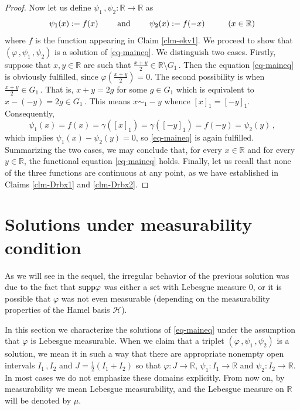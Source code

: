 \documentclass[12pt]{amsart}
\theoremstyle{remark}
\theoremstyle{definition}
\newcommand{\dlth}{\mathcal{H}}
\newcommand{\RR}{\mathbb{R}}
\newcommand{\supp}{\mbox{\rm supp}}
\newcommand{\map}{\longrightarrow}
\begin{document}
\begin{proof}
Now let us define 
$ \psi_1 \,, \psi_2 : \RR \map \RR $ 
as  
\[
\psi_1(x) := f(x) 
\qquad \mbox{ and } \qquad
\psi_2(x) := f(-x) \hspace{10 mm} (x \in \RR) 
\]
where $ f $ is the function 
appearing in Claim \ref{clm-ekv1}. 
We proceed to show that 
$ \left( \varphi \,, \psi_1 \,, \psi_2 \right) $ 
is a solution of \eqref{eq-maineq}. 
We distinguish two cases. 
Firstly, suppose that $ x,y \in \RR $ 
are such that 
$ \frac{x+y}{2} \in \RR \setminus G_1 \,$. 
Then the equation \eqref{eq-maineq} 
is obviously fulfilled, since 
$ \varphi \left( \frac{x+y}{2} \right) = 0 $. 
The second possibility is when 
$ \frac{x+y}{2} \in G_1 \,$. That is, 
$ x+y = 2g $ for some $ g \in G_1 $ 
which is equivalent to 
$ x - (-y) = 2g \in G_1 \,$. 
This means $ x \sim_1 -y $ whence 
$ [x]_1 = [-y]_1 $. Consequently, 
\[
\psi_1(x) = f(x) = \gamma \left( [x]_1 \right) = 
\gamma \left( [-y]_1 \right) = 
f( -y ) = \psi_2(y) \,, 
\]
which implies 
$ \psi_1(x) - \psi_2(y) = 0 $, so \eqref{eq-maineq} 
is again fulfilled. 
Summarizing the two cases, we may conclude that, 
for every $ x \in \RR $ 
and for every $ y \in \RR $, 
the functional equation \eqref{eq-maineq} holds. 
Finally, let us recall that none of the three functions 
are continuous at any point, 
as we have established in 
Claims \ref{clm-Drbx1} and \ref{clm-Drbx2}.
\end{proof}


\section[Measurable solutions]{Solutions under measurability condition}

As we will see in the sequel, the irregular behavior 
of the previous solution was due to the fact that 
$ \supp \varphi $ was either a set 
with Lebesgue measure $ 0 $, 
or it is possible that $ \varphi $ was not even measurable 
(depending on the measurability properties of 
the Hamel basis $ \dlth $). 

In this section we characterize the solutions of 
\eqref{eq-maineq} under the assumption that 
$ \varphi $ is Lebesgue measurable. 
When we claim that a triplet 
$ \left( \varphi \,, \psi_1 \,, \psi_2 \right) $ 
is a solution, we mean it in such a way that 
there are appropriate nonempty open intervals 
$ I_1 \,, I_2 $ and $ J = \frac{1}{2} (I_1 + I_2) $ 
so that 
$ \varphi : J \map \RR $, 
$ \psi_1 : I_1 \map \RR $ and 
$ \psi_2 : I_2 \map \RR $. In most cases 
we do not emphasize these domains explicitly. 
From now on, by measurability we 
mean Lebesgue measurability, 
and the Lebesgue measure on $ \RR $ 
will be denoted by $ \mu $. 
\end{document}
